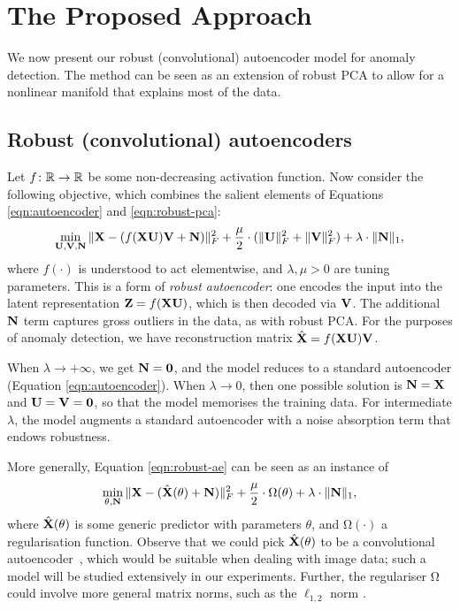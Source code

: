 \section{The Proposed Approach}
\label{sec:method}

We now present our robust (convolutional) autoencoder model for anomaly detection.
The method can be seen as an extension of robust PCA to allow for a nonlinear manifold that explains most of the data.

%
\subsection{Robust (convolutional) autoencoders}

Let $f \colon \mathbb{R} \to \mathbb{R}$ be some non-decreasing {activation function}.
Now consider the following objective, which combines the salient elements of Equations \ref{eqn:autoencoder} and \ref{eqn:robust-pca}:
\begin{equation}
	\label{eqn:robust-ae}
	\min_{\mathbf{U}, \mathbf{V}, \mathbf{N}} \| \mathbf{X} - (f(\mathbf{X} \mathbf{U}) \mathbf{V} + \mathbf{N}) \|_F^2 + \frac{\mu}{2} \cdot (\| \mathbf{U} \|_F^2 + \| \mathbf{V} \|_F^2) + \lambda \cdot \| \mathbf{N} \|_1,
\end{equation}
where $f( \cdot )$ is understood to act elementwise, and $\lambda, \mu > 0$ are tuning parameters.
This is a form of \emph{robust autoencoder}:
one encodes the input into the latent representation $\mathbf{Z} = f( \mathbf{X} \mathbf{U} )$,
which is then decoded via $\mathbf{V}$.
The additional $\mathbf{N}$ term captures gross outliers in the data, as with robust PCA.
For the purposes of anomaly detection, we have reconstruction matrix $\hat{\mathbf{X}} = f(\mathbf{X} \mathbf{U}) \mathbf{V}$.

When $\lambda \to +\infty$, we get $\mathbf{N} = \mathbf{0}$, and the model reduces to a standard autoencoder (Equation \ref{eqn:autoencoder}).
When $\lambda \to 0$, then one possible solution is $\mathbf{N} = \mathbf{X}$ and $\mathbf{U} = \mathbf{V} = \mathbf{0}$, so that the model memorises the training data.
For intermediate $\lambda$, the model augments a standard autoencoder with a noise absorption term that endows robustness.

More generally, Equation \ref{eqn:robust-ae} can be seen as an instance of
\begin{equation}
	\label{eqn:robust-cae}
	\min_{\theta, \mathbf{N}} \| \mathbf{X} - (\hat{\mathbf{X}}( \theta ) + \mathbf{N}) \|_F^2 + \frac{\mu}{2} \cdot \mathrm{\Omega}( \theta ) + \lambda \cdot \| \mathbf{N} \|_1,
\end{equation}
where $\hat{\mathbf{X}}( \theta )$ is some generic predictor with parameters $\theta$, and $\mathrm{\Omega}( \cdot )$ a regularisation function.
Observe that we could pick $\hat{\mathbf{X}}( \theta )$ to be a convolutional autoencoder~\cite{Jain:2008,vincent2010stacked}, which would be suitable when dealing with image data;
such a model will be studied extensively in our experiments.
Further, the regulariser $\mathrm{\Omega}$ could involve more general matrix norms, such as the $\ell_{1,2}$ norm \cite{Huang:2010}.


